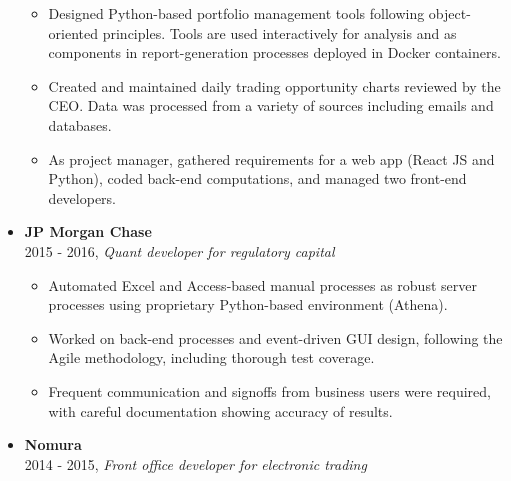 \documentclass[margin]{res}
\def\tightlist{}
\begin{document}
\begin{resume}
\begin{itemize}
  \begin{itemize}
  \tightlist
  \item
    Designed Python-based portfolio management tools following
    object-oriented principles. Tools are used interactively for
    analysis and as components in report-generation processes deployed
    in Docker containers.
  \item
    Created and maintained daily trading opportunity charts reviewed by
    the CEO. Data was processed from a variety of sources including
    emails and databases.
  \item
    As project manager, gathered requirements for a web app (React JS
    and Python), coded back-end computations, and managed two front-end
    developers.
  \end{itemize}
\item
  \textbf{JP Morgan Chase}\\
  2015 - 2016, \emph{Quant developer for regulatory capital}

  \begin{itemize}
  \tightlist
  \item
    Automated Excel and Access-based manual processes as robust server
    processes using proprietary Python-based environment (Athena).
  \item
    Worked on back-end processes and event-driven GUI design, following
    the Agile methodology, including thorough test coverage.
  \item
    Frequent communication and signoffs from business users were
    required, with careful documentation showing accuracy of results.
  \end{itemize}
\item
  \textbf{Nomura}\\
  2014 - 2015, \emph{Front office developer for electronic trading}


\end{itemize}
\end{resume}
\end{document}
